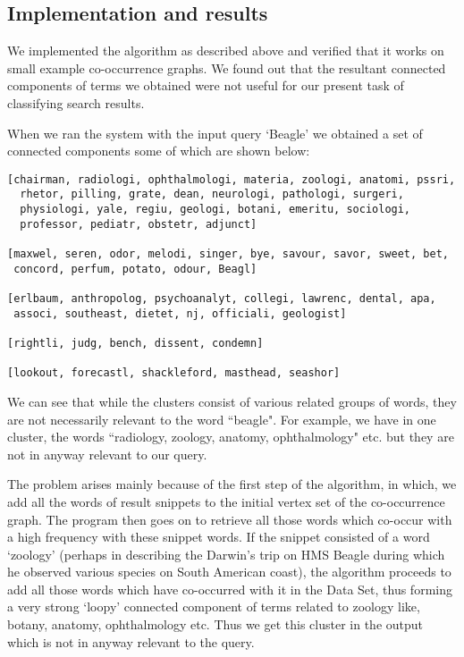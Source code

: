 \documentclass[a4paper,12pt]{report}
\begin{document}
\subsection{Implementation and results}
We implemented the algorithm as described above and verified that it
works on small example co-occurrence graphs. We found out that the
resultant connected components of terms we obtained were not useful
for our present task of classifying search results. 

When we ran the system with the input query `Beagle' we obtained a set
of connected components some of which are shown below:
\begin{verbatim}
[chairman, radiologi, ophthalmologi, materia, zoologi, anatomi, pssri,
  rhetor, pilling, grate, dean, neurologi, pathologi, surgeri,
  physiologi, yale, regiu, geologi, botani, emeritu, sociologi,
  professor, pediatr, obstetr, adjunct]

[maxwel, seren, odor, melodi, singer, bye, savour, savor, sweet, bet,
 concord, perfum, potato, odour, Beagl]

[erlbaum, anthropolog, psychoanalyt, collegi, lawrenc, dental, apa,
 associ, southeast, dietet, nj, officiali, geologist]

[rightli, judg, bench, dissent, condemn]

[lookout, forecastl, shackleford, masthead, seashor]

\end{verbatim}

 We can see that while the clusters consist of various related groups
 of words, they are not necessarily relevant to the word ``beagle". For
 example, we have in one cluster, the words ``radiology, zoology,
 anatomy, ophthalmology" etc. but they are not in anyway relevant to
 our query.

The problem arises mainly because of the first step of the algorithm,
in which, we add all the words of result snippets to the initial
vertex set of the co-occurrence graph. The program then goes on to
retrieve all those words which co-occur with a high frequency with
these snippet words. If the snippet consisted of a word `zoology'
(perhaps in describing the Darwin's trip on HMS Beagle during which he
observed various species on South American coast), the algorithm
proceeds to add all those words which have co-occurred with it in the
Data Set, thus forming a very strong `loopy' connected component of
terms related to zoology like, botany, anatomy, ophthalmology
etc. Thus we get this cluster in the output which is not in anyway
relevant to the query.
\end{document}
